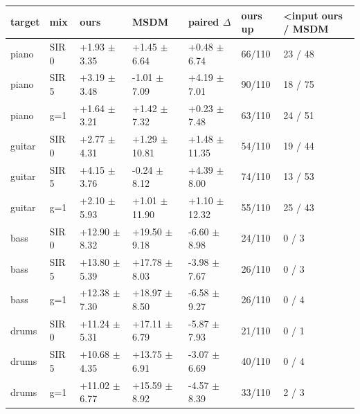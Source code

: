 \begin{tabular}{lllllll}
\toprule
target & mix & ours & MSDM & paired $\Delta$ & ours up & <input ours / MSDM\\
\midrule
piano & SIR 0 & +1.93 $\pm$ 3.35 & +1.45 $\pm$ 6.64 & +0.48 $\pm$ 6.74 & 66/110 & 23 / 48\\
piano & SIR 5 & +3.19 $\pm$ 3.48 & -1.01 $\pm$ 7.09 & +4.19 $\pm$ 7.01 & 90/110 & 18 / 75\\
piano & g=1 & +1.64 $\pm$ 3.21 & +1.42 $\pm$ 7.32 & +0.23 $\pm$ 7.48 & 63/110 & 24 / 51\\
guitar & SIR 0 & +2.77 $\pm$ 4.31 & +1.29 $\pm$ 10.81 & +1.48 $\pm$ 11.35 & 54/110 & 19 / 44\\
guitar & SIR 5 & +4.15 $\pm$ 3.76 & -0.24 $\pm$ 8.12 & +4.39 $\pm$ 8.00 & 74/110 & 13 / 53\\
guitar & g=1 & +2.10 $\pm$ 5.93 & +1.01 $\pm$ 11.90 & +1.10 $\pm$ 12.32 & 55/110 & 25 / 43\\
bass & SIR 0 & +12.90 $\pm$ 8.32 & +19.50 $\pm$ 9.18 & -6.60 $\pm$ 8.98 & 24/110 & 0 / 3\\
bass & SIR 5 & +13.80 $\pm$ 5.39 & +17.78 $\pm$ 8.03 & -3.98 $\pm$ 7.67 & 26/110 & 0 / 3\\
bass & g=1 & +12.38 $\pm$ 7.30 & +18.97 $\pm$ 8.50 & -6.58 $\pm$ 9.27 & 26/110 & 0 / 4\\
drums & SIR 0 & +11.24 $\pm$ 5.31 & +17.11 $\pm$ 6.79 & -5.87 $\pm$ 7.93 & 21/110 & 0 / 1\\
drums & SIR 5 & +10.68 $\pm$ 4.35 & +13.75 $\pm$ 6.91 & -3.07 $\pm$ 6.69 & 40/110 & 0 / 4\\
drums & g=1 & +11.02 $\pm$ 6.77 & +15.59 $\pm$ 8.92 & -4.57 $\pm$ 8.39 & 33/110 & 2 / 3\\
\bottomrule
\end{tabular}
